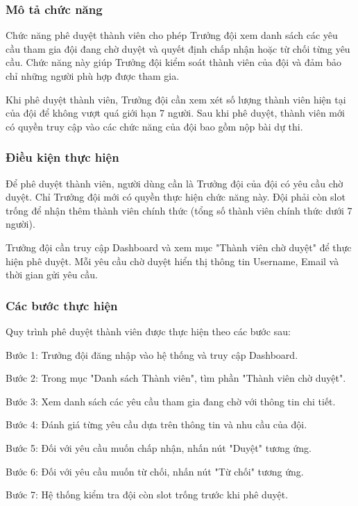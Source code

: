 \subsubsection{Mô tả chức năng}

Chức năng phê duyệt thành viên cho phép Trưởng đội xem danh sách các yêu cầu tham gia đội đang chờ duyệt và quyết định chấp nhận hoặc từ chối từng yêu cầu. Chức năng này giúp Trưởng đội kiểm soát thành viên của đội và đảm bảo chỉ những người phù hợp được tham gia.

Khi phê duyệt thành viên, Trưởng đội cần xem xét số lượng thành viên hiện tại của đội để không vượt quá giới hạn 7 người. Sau khi phê duyệt, thành viên mới có quyền truy cập vào các chức năng của đội bao gồm nộp bài dự thi.

\subsubsection{Điều kiện thực hiện}

Để phê duyệt thành viên, người dùng cần là Trưởng đội của đội có yêu cầu chờ duyệt. Chỉ Trưởng đội mới có quyền thực hiện chức năng này. Đội phải còn slot trống để nhận thêm thành viên chính thức (tổng số thành viên chính thức dưới 7 người).

Trưởng đội cần truy cập Dashboard và xem mục "Thành viên chờ duyệt" để thực hiện phê duyệt. Mỗi yêu cầu chờ duyệt hiển thị thông tin Username, Email và thời gian gửi yêu cầu.

\subsubsection{Các bước thực hiện}

Quy trình phê duyệt thành viên được thực hiện theo các bước sau:

Bước 1: Trưởng đội đăng nhập vào hệ thống và truy cập Dashboard.

Bước 2: Trong mục "Danh sách Thành viên", tìm phần "Thành viên chờ duyệt".

Bước 3: Xem danh sách các yêu cầu tham gia đang chờ với thông tin chi tiết.

Bước 4: Đánh giá từng yêu cầu dựa trên thông tin và nhu cầu của đội.

Bước 5: Đối với yêu cầu muốn chấp nhận, nhấn nút "Duyệt" tương ứng.

Bước 6: Đối với yêu cầu muốn từ chối, nhấn nút "Từ chối" tương ứng.

Bước 7: Hệ thống kiểm tra đội còn slot trống trước khi phê duyệt.

